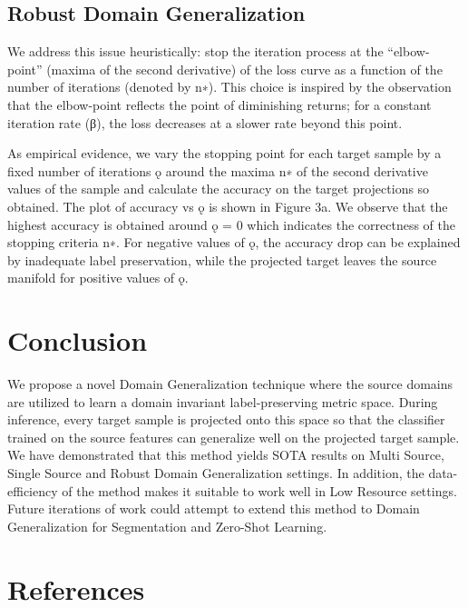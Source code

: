\documentclass[review]{cvpr}
\begin{document}
\subsection{Robust Domain Generalization}

We address this issue heuristically: stop the iteration process at the “elbow-point” (maxima of the second derivative)
of the loss curve as a function of the number of iterations
(denoted by n∗). This choice is inspired by the observation that the elbow-point reflects the point of diminishing
returns; for a constant iteration rate (β), the loss decreases
at a slower rate beyond this point.\par
As empirical evidence, we vary the stopping point for
each target sample by a fixed number of iterations ǫ around
the maxima n∗ of the second derivative values of the sample
and calculate the accuracy on the target projections so obtained. The plot of accuracy vs ǫ is shown in Figure 3a. We
observe that the highest accuracy is obtained around ǫ = 0
which indicates the correctness of the stopping criteria n∗.
For negative values of ǫ, the accuracy drop can be explained
by inadequate label preservation, while the projected target
leaves the source manifold for positive values of ǫ.
\section{Conclusion}
We propose a novel Domain Generalization technique
where the source domains are utilized to learn a domain
invariant label-preserving metric space. During inference,
every target sample is projected onto this space so that the
classifier trained on the source features can generalize well
on the projected target sample. We have demonstrated that
this method yields SOTA results on Multi Source, Single
Source and Robust Domain Generalization settings. In addition, the data-efficiency of the method makes it suitable
to work well in Low Resource settings. Future iterations of
work could attempt to extend this method to Domain Generalization for Segmentation and Zero-Shot Learning.

\section{References}

{\small


}
\end{document}
